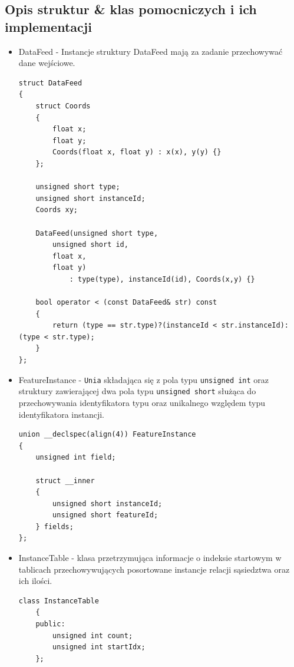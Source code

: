 \documentclass[12pt]{article}
\newcounter{operator}
\begin{document}
\subsection{Opis struktur \& klas pomocniczych i ich implementacji}
    
\begin{itemize}
\item DataFeed - Instancje struktury DataFeed mają za zadanie przechowywać dane wejściowe.

\begin{minipage}{\linewidth}
\begin{lstlisting}[caption={Kod struktury DataFeed}]
struct DataFeed
{
    struct Coords
    {
        float x;
        float y;
        Coords(float x, float y) : x(x), y(y) {}
    };
    
	unsigned short type;
	unsigned short instanceId;
	Coords xy;
    
	DataFeed(unsigned short type,
        unsigned short id,
        float x,
        float y)
    		: type(type), instanceId(id), Coords(x,y) {}

	bool operator < (const DataFeed& str) const
	{
		return (type == str.type)?(instanceId < str.instanceId):(type < str.type);
	}
};
\end{lstlisting}
\end{minipage}

\item FeatureInstance - \lstinline{Unia} składająca się z pola typu \lstinline{unsigned int} oraz struktury zawierającej dwa pola typu \lstinline{unsigned short} służąca do przechowywania identyfikatora typu oraz unikalnego względem typu identyfikatora instancji.

\begin{lstlisting}
union __declspec(align(4)) FeatureInstance
{
	unsigned int field;

	struct __inner
	{
		unsigned short instanceId;
		unsigned short featureId;
	} fields;
};
\end{lstlisting}

\item InstanceTable - klasa przetrzymująca informacje o indeksie startowym w tablicach przechowywujących posortowane instancje relacji sąsiedztwa oraz ich ilości. 

\begin{minipage}{\linewidth}
\begin{lstlisting}[caption={Kod klasy InstanceTable}]
	class InstanceTable
	{
	public:
		unsigned int count;
		unsigned int startIdx;
	};
\end{lstlisting}
\end{minipage}


\end{itemize}
\end{document}
